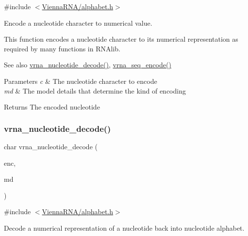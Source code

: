 {\ttfamily \#include $<$\mbox{\hyperlink{alphabet_8h}{Vienna\+R\+N\+A/alphabet.\+h}}$>$}



Encode a nucleotide character to numerical value. 

This function encodes a nucleotide character to its numerical representation as required by many functions in R\+N\+Alib.

\begin{DoxySeeAlso}{See also}
\mbox{\hyperlink{group__utils_ga48ef585e697be9c8a08ed68c655e29b6}{vrna\+\_\+nucleotide\+\_\+decode()}}, \mbox{\hyperlink{group__utils_ga636e7d6f888fd639587296a5eddea660}{vrna\+\_\+seq\+\_\+encode()}}
\end{DoxySeeAlso}

\begin{DoxyParams}{Parameters}
{\em c} & The nucleotide character to encode \\
\hline
{\em md} & The model details that determine the kind of encoding \\
\hline
\end{DoxyParams}
\begin{DoxyReturn}{Returns}
The encoded nucleotide 
\end{DoxyReturn}
\mbox{\label{group__utils_ga48ef585e697be9c8a08ed68c655e29b6}} 
\subsubsection{\texorpdfstring{vrna\+\_\+nucleotide\+\_\+decode()}{vrna\_nucleotide\_decode()}}
{\footnotesize\ttfamily char vrna\+\_\+nucleotide\+\_\+decode (\begin{DoxyParamCaption}\item[{int}]{enc,  }\item[{\mbox{\hyperlink{group__model__details_ga1f8a10e12a0a1915f2a4eff0b28ea17c}{vrna\+\_\+md\+\_\+t}} $\ast$}]{md }\end{DoxyParamCaption})}



{\ttfamily \#include $<$\mbox{\hyperlink{alphabet_8h}{Vienna\+R\+N\+A/alphabet.\+h}}$>$}



Decode a numerical representation of a nucleotide back into nucleotide alphabet. 

